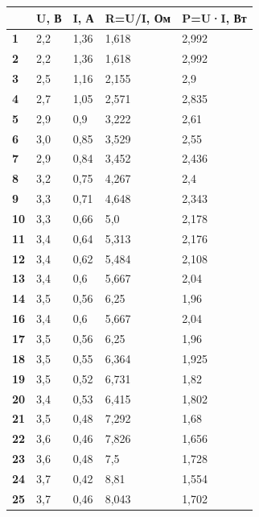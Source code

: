 \documentclass[14pt, a4paper, twoside]{extreport}
\begin{document}
\begin{table}[H]
  \centering
  \footnotesize
  \begin{tabular}{|l|l|l|l|l|}
    \hline
    & \textbf{U, В}            & \textbf{I, А}             & \textbf{R=U/I, Ом}          & \textbf{P=U·I, Вт}         \\ \hline
    \textbf{1}  & 2,2 & 1,36 & 1,618  & 2,992 \\ \hline
    \textbf{2}  & 2,2 & 1,36 & 1,618  & 2,992 \\ \hline
    \textbf{3}  & 2,5 & 1,16 & 2,155  & 2,9   \\ \hline
    \textbf{4}  & 2,7 & 1,05 & 2,571  & 2,835 \\ \hline
    \textbf{5}  & 2,9 & 0,9  & 3,222  & 2,61  \\ \hline
    \textbf{6}  & 3,0 & 0,85 & 3,529  & 2,55  \\ \hline
    \textbf{7}  & 2,9 & 0,84 & 3,452  & 2,436 \\ \hline
    \textbf{8}  & 3,2 & 0,75 & 4,267  & 2,4   \\ \hline
    \textbf{9}  & 3,3 & 0,71 & 4,648  & 2,343 \\ \hline
    \textbf{10} & 3,3 & 0,66 & 5,0    & 2,178 \\ \hline
    \textbf{11} & 3,4 & 0,64 & 5,313  & 2,176 \\ \hline
    \textbf{12} & 3,4 & 0,62 & 5,484  & 2,108 \\ \hline
    \textbf{13} & 3,4 & 0,6  & 5,667  & 2,04  \\ \hline
    \textbf{14} & 3,5 & 0,56 & 6,25   & 1,96  \\ \hline
    \textbf{16} & 3,4 & 0,6  & 5,667  & 2,04  \\ \hline
    \textbf{17} & 3,5 & 0,56 & 6,25   & 1,96  \\ \hline
    \textbf{18} & 3,5 & 0,55 & 6,364  & 1,925 \\ \hline
    \textbf{19} & 3,5 & 0,52 & 6,731  & 1,82  \\ \hline
    \textbf{20} & 3,4 & 0,53 & 6,415  & 1,802 \\ \hline
    \textbf{21} & 3,5 & 0,48 & 7,292  & 1,68  \\ \hline
    \textbf{22} & 3,6 & 0,46 & 7,826  & 1,656 \\ \hline
    \textbf{23} & 3,6 & 0,48 & 7,5    & 1,728 \\ \hline
    \textbf{24} & 3,7 & 0,42 & 8,81   & 1,554 \\ \hline
    \textbf{25} & 3,7 & 0,46 & 8,043  & 1,702 \\ \hline

\end{tabular}
\end{table}
\end{document}
